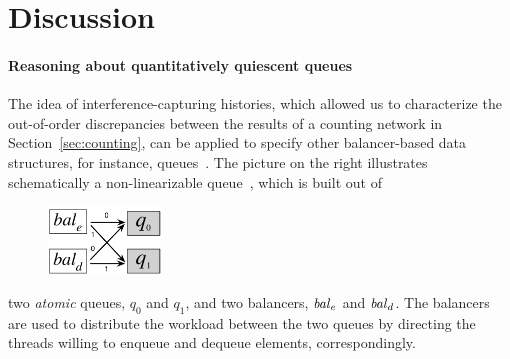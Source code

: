 \section{Discussion}
\label{sec:discussion}

%



\paragraph{Reasoning about quantitatively quiescent queues}

The idea of interference-capturing histories, which allowed us to
characterize the out-of-order discrepancies between the results of a
counting network in Section~\ref{sec:counting},
%
can be applied to specify other balancer-based data structures, for
instance, queues~\cite{Derrick-al:FM14}.
%
The picture on the right illustrates schematically a non-linearizable
queue~\cite{Derrick-al:FM14}, which is built out of 
%
\begin{figure}   
\centering 
\includegraphics[width=3.0cm]{queue.pdf} 
\end{figure}
%
two \emph{atomic} queues, $q_0$ and $q_1$, and two
balancers, $\mathit{bal}_e$ and $\mathit{bal}_d$.  The balancers are used to
distribute the workload between the two queues by directing the
threads willing to enqueue and dequeue elements, correspondingly.

